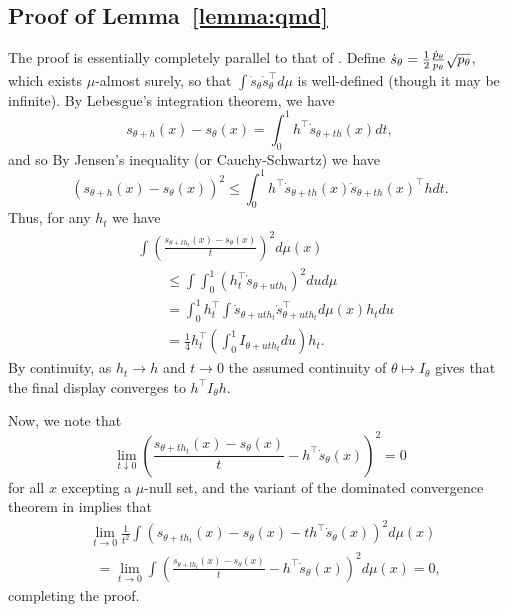 \subsection{Proof of Lemma~\ref{lemma:qmd}}
\label{sec:proof-qmd}

The proof is essentially completely parallel to that of \cite[Lemma
  7.6]{VanDerVaart98}. Define $\dot{s}_\theta = \frac{1}{2}
\frac{\dot{p}_\theta}{p_\theta} \sqrt{p_\theta}$, which exists $\mu$-almost
surely, so that $\int \dot{s}_\theta \dot{s}_\theta^\top d\mu$ is
well-defined (though it may be infinite). By Lebesgue's integration theorem,
we have
\begin{equation*}
  s_{\theta + h}(x) - s_\theta(x) = \int_0^1 h^\top \dot{s}_{\theta + t h}(x) dt,
\end{equation*}
and so By Jensen's inequality (or Cauchy-Schwartz) we have
\begin{equation*}
  (s_{\theta + h}(x) - s_\theta(x))^2
  \le \int_0^1 h^\top \dot{s}_{\theta + t h}(x)
  \dot{s}_{\theta + t h}(x) ^\top h dt.
\end{equation*}
Thus, for any $h_t$ we have
\begin{align*}
  & \int \left(\frac{s_{\theta + t h_t}(x) - s_\theta(x)}{t}\right)^2
  d\mu(x) \\
  & \qquad \le \int \int_0^1 (h_t^\top \dot{s}_{\theta + u t h_t})^2 du
  d\mu \\
  & \qquad  = \int_0^1 h_t^\top \int
  \dot{s}_{\theta + u t h_t}\dot{s}_{\theta + u t h_t}^\top
  d\mu(x) h_t  du \\
  & \qquad = \frac{1}{4} h_t^\top \left(\int_0^1 I_{\theta + u t h_t} du\right) h_t.
\end{align*}
By continuity, as $h_t \to h$ and $t \to 0$ the assumed continuity
of $\theta \mapsto I_\theta$ gives that the final display converges
to $h^\top I_\theta h$.

Now, we note that
\begin{equation*}
  \lim_{t \downarrow 0}
  \left(\frac{s_{\theta + t h_t}(x) - s_\theta(x)}{t}
  - h^\top \dot{s}_\theta(x)\right)^2 = 0
\end{equation*}
for all $x$ excepting a $\mu$-null set, and the
variant of the dominated convergence theorem in
\cite[Prop.~2.29]{VanDerVaart98} implies that
\begin{align*}
  & \lim_{t \to 0} 
  \frac{1}{t^2}
  \int \left(s_{\theta + t h_t}(x) - s_\theta(x)
  - t h^\top \dot{s}_\theta(x)\right)^2 d\mu(x) \\
  & ~~ = \lim_{t \to 0}
  \int \left(\frac{s_{\theta + t h_t}(x) - s_\theta(x)}{t}
  - h^\top \dot{s}_\theta(x)\right)^2 d\mu(x)
  = 0,
\end{align*}
completing the proof.

